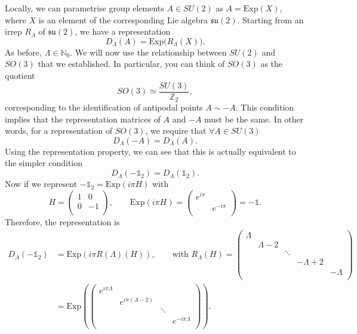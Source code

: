 Locally, we can parametrise group elements $A \in SU(2)$ as $A = \text{Exp}(X)$, where $X$ is an element of the corresponding Lie algebra $\mathfrak{su}(2)$.
Starting from an irrep $R_\Lambda$ of $\mathfrak{su}(2)$, we have a representation 
\begin{equation}
  D_\Lambda(A) = \text{Exp} \bigl(R_\Lambda(X)\bigr).
\end{equation}
As before, $\Lambda \in \mathbb{N}_0$.
We will now use the relationship between $SU(2)$ and $SO(3)$ that we established. In particular, you can think of $SO(3)$ as the quotient
\begin{equation}
  SO(3) \simeq \frac{SU(3)}{\mathbb{Z}_2},
\end{equation}
corresponding to the identification of antipodal points $A \sim -A$.
This condition implies that the representation matrices of $A$ and $-A$ must be the same.
In other words, for a representation of $SO(3)$, we require that $\forall A \in SU(3)$
\begin{equation}
  D_\Lambda(-A) = D_\Lambda(A).
\end{equation}
Using the representation property, we can see that this is actually equivalent to the simpler condition
\begin{equation}
  D_\Lambda (-\mathbb{1}_2) = D_{\Lambda}(\mathbb{1}_2).
\end{equation}
Now if we represent $-\mathbb{1}_2 = \text{Exp}(i\pi H)$ with 
\begin{equation}
  H = 
  \begin{pmatrix}
   1 & 0 \\
   0 & -1 \\
  \end{pmatrix}, 
  \qquad \text{Exp}(i \pi H) = 
  \begin{pmatrix}
   e^{i\pi} &  \\
    & e^{-i\pi} \\
  \end{pmatrix} = -\mathbb{1}.
\end{equation}
Therefore, the representation is
\begin{align}
  D_\Lambda(-\mathbb{1}_2) &= \text{Exp}(i\pi R(\Lambda)(H)), \qquad \text{with } R_\Lambda(H) = 
  \begin{pmatrix}
   \Lambda &  &  &  &  \\
    & \Lambda-2 &  &  &  \\
    &  & \ddots &  &  \\
    &  &  & -\Lambda + 2 &  \\
    &  &  &  & -\Lambda \\
  \end{pmatrix} \\
			   &= \text{Exp} \left( 
           \begin{pmatrix}
            e^{i\pi \Lambda} &  &  &  \\
			     & e^{i \pi (\Lambda - 2)} &  &  \\
             &  & \ddots &  \\
             &  &  & e^{-i \pi \Lambda} \\
           \end{pmatrix}
			   \right).
\end{align}
